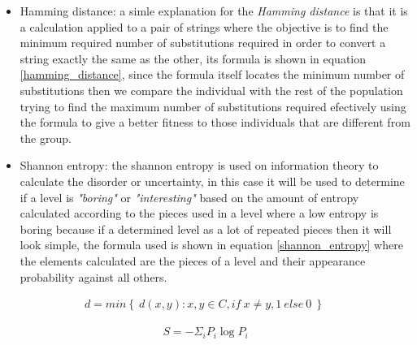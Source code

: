 \documentclass[conference]{IEEEtran}
\begin{document}
\begin{itemize}
    \item Hamming distance: a simle explanation for the \textit{Hamming
    distance} is that it is a calculation applied to a pair of strings where the
    objective is to find the minimum required number of substitutions required in
    order to convert a string exactly the same as the other, its formula is
    shown in equation \ref{hamming_distance}, since the formula itself locates
    the minimum number of substitutions then we compare the individual
    with the rest of the population trying to find the maximum number of
    substitutions required efectively using the formula to give a better fitness
    to those individuals that are different from the group.
    \item Shannon entropy: the shannon entropy is used on information theory to
    calculate the disorder or uncertainty, in this case it will be used to
    determine if a level is \textit{"boring"} or \textit{"interesting"} based on
    the amount of entropy calculated according to the pieces used in a level
    where a low entropy is boring because if a determined level as a lot of
    repeated pieces then it will look simple, the formula used is shown in
    equation \ref{shannon_entropy} where the elements calculated are the pieces
    of a level and their appearance probability against all others.
\end{itemize}

\begin{equation}
    \begin{aligned}
    d = min \left\{ \ d(x,y): x,y \in C, if \: x \neq y, 1 \: else \: 0 \: \right\} \
    \end{aligned}
    \label{hamming_distance}
\end{equation}

\begin{equation}
    \begin{aligned}
    S = - \Sigma_i P_i \log P_i
    \end{aligned}
    \label{shannon_entropy}
\end{equation}
\end{document}
